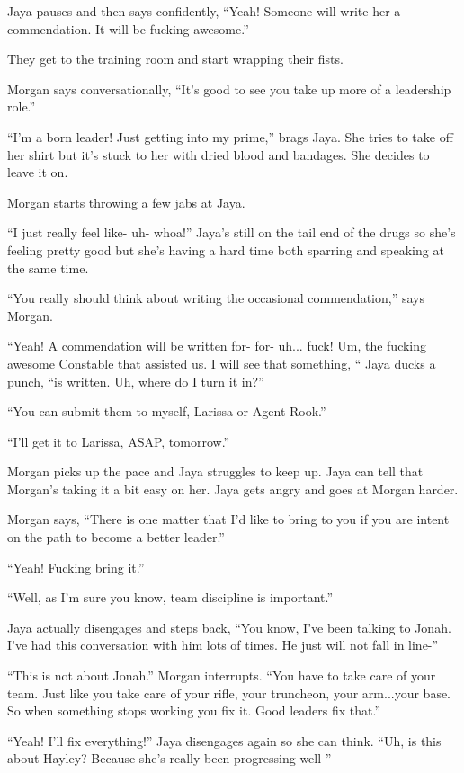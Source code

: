 Jaya pauses and then says confidently, ``Yeah!  Someone will write her a commendation.  It will be fucking awesome.'' 



They get to the training room and start wrapping their fists.

Morgan says conversationally, ``It's good to see you take up more of a leadership role.''

``I'm a born leader! Just getting into my prime,'' brags Jaya.  She tries to take off her shirt but it's stuck to her with dried blood and bandages.  She decides to leave it on.  

Morgan starts throwing a few jabs at Jaya.

``I just really feel like- uh- whoa!'' Jaya's still on the tail end of the drugs so she's feeling pretty good but she's having a hard time both sparring and speaking at the same time.

``You really should think about writing the occasional commendation,'' says Morgan.

``Yeah!  A commendation will be written for- for- uh... fuck!  Um, the fucking awesome Constable that assisted us.  I will see that something, `` Jaya ducks a punch, ``is written.  Uh, where do I turn it in?''

``You can submit them to myself, Larissa or Agent Rook.''

``I'll get it to Larissa, ASAP, tomorrow.''

Morgan picks up the pace and Jaya struggles to keep up.  Jaya can tell that Morgan's taking it a bit easy on her.  Jaya gets angry and goes at Morgan harder.

Morgan says, ``There is one matter that I'd like to bring to you if you are intent on the path to become a better leader.''

``Yeah!  Fucking bring it.''

``Well, as I'm sure you know, team discipline is important.''

Jaya actually disengages and steps back, ``You know, I've been talking to Jonah.  I've had this conversation with him lots of times.  He just will not fall in line-''

``This is not about Jonah.'' Morgan interrupts.  ``You have to take care of your team.  Just like you take care of your rifle, your truncheon, your arm...your base.  So when something stops working you fix it.  Good leaders fix that.''

``Yeah!  I'll fix everything!'' Jaya disengages again so she can think.  ``Uh, is this about Hayley?  Because she's really been progressing well-''

